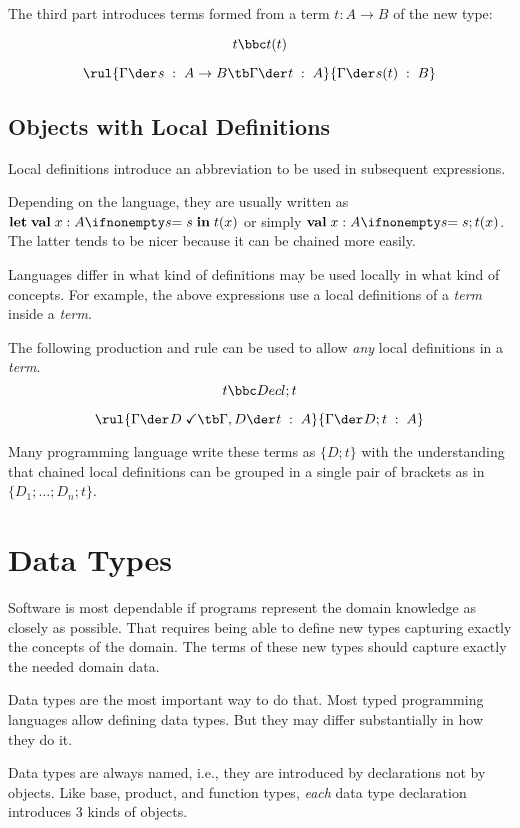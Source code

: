 The third part introduces terms formed from a term $t:A\to B$ of the new type:

\[t \bbc t(t)\]

\[\rul{\oftype{}{\Gamma}{s}{A\to B}\tb \oftype{}{\Gamma}{t}{A}}{\oftype{}{\Gamma}{s(t)}{B}}\]

  
\subsection{Objects with Local Definitions}

Local definitions introduce an abbreviation to be used in subsequent expressions.

Depending on the language, they are usually written as $\akey{let}\aval{x}{A}{s}\;\akey{in}t(x)$ or simply $\aval{x}{A}{s};t(x)$.
The latter tends to be nicer because it can be chained more easily.

Languages differ in what kind of definitions may be used locally in what kind of concepts.
For example, the above expressions use a local definitions of a \emph{term} inside a \emph{term}.

The following production and rule can be used to allow \emph{any} local definitions in a \emph{term}.
\[t \bbc Decl; t\]

\[\rul{\isdecl{}{\Gamma}{D}\tb\oftype{}{\Gamma,D}{t}{A}}{\oftype{}{\Gamma}{D; t}{A}}\]

Many programming language write these terms as $\{D;t\}$ with the understanding that chained local definitions can be grouped in a single pair of brackets as in $\{D_1;\ldots;D_n;t\}$.

\section{Data Types}

Software is most dependable if programs represent the domain knowledge as closely as possible.
That requires being able to define new types capturing exactly the concepts of the domain.
The terms of these new types should capture exactly the needed domain data.

Data types are the most important way to do that.
Most typed programming languages allow defining data types.
But they may differ substantially in how they do it.

Data types are always named, i.e., they are introduced by declarations not by objects.
Like base, product, and function types, \emph{each} data type declaration introduces $3$ kinds of objects.

